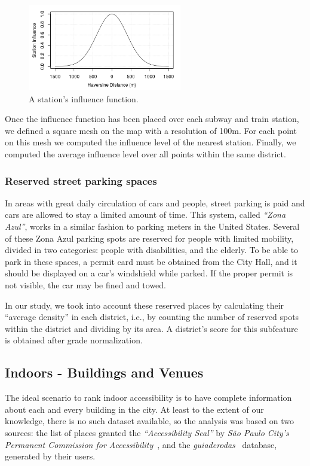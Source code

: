 \documentclass[12pt]{article}
\begin{document}
\begin{figure}[ht]
	\centering
	\includegraphics[width=0.60\textwidth]{influence_map}
	\caption{A station's influence function.}
	\label{fig:influence_area}
\end{figure}

Once the influence function has been placed over each subway and train station, we defined a square mesh on the map with a resolution of 100m.
For each point on this mesh we computed the influence level of the nearest station.
Finally, we computed the average influence level over all points within the same district.

\subsubsection{Reserved street parking spaces}
In areas with great daily circulation of cars and people, street parking is paid
and cars are allowed to stay a limited amount of time.
This system, called \emph{``Zona Azul''}, works in a similar fashion to parking meters in the United States.
Several of these Zona Azul parking spots are reserved for people with limited mobility,
divided in two categories: people with disabilities, and the elderly.
To be able to park in these spaces, a permit card must be obtained from the City Hall,
and it should be displayed on a car's windshield while parked.
If the proper permit is not visible, the car may be fined and towed.

In our study, we took into account these reserved places by
calculating their ``average density'' in each district,
i.e., by counting the number of reserved spots within the district and dividing by its area.
A district's score for this subfeature is obtained after grade normalization.

\subsection{Indoors - Buildings and Venues}
\label{sub:indoors}

The ideal scenario to rank indoor accessibility is to have complete information
about each and every building in the city.
At least to the extent of our knowledge, there is no such dataset available,
so the analysis was based on two sources:
the list of places granted the \emph{``Accessibility Seal''} by \emph{São Paulo City's Permanent Commission for Accessibility}~\cite{geosampa:2000},
and the \emph{guiaderodas}~\cite{guiaderodas} database, generated by their users.
\end{document}
